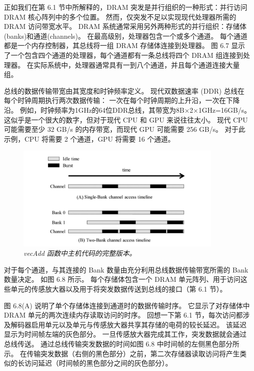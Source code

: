 正如我们在第 6.1 节中所解释的，DRAM 突发是并行组织的一种形式：并行访问 DRAM 核心阵列中的多个位置。 
然而，仅突发不足以实现现代处理器所需的 DRAM 访问带宽水平。 
DRAM 系统通常采用另外两种形式的并行组织：存储体(banks)和通道(channels)。 
在最高级别，处理器包含一个或多个通道。 每个通道都是一个内存控制器，其总线将一组 DRAM 存储体连接到处理器。 
图 6.7 显示了一个包含四个通道的处理器，每个通道都有一条总线将四个 DRAM 组连接到处理器。 
在实际系统中，处理器通常具有一到八个通道，并且每个通道连接大量组。

总线的数据传输带宽由其宽度和时钟频率定义。 现代双数据速率 (DDR) 总线在每个时钟周期执行两次数据传输：
一次在每个时钟周期的上升沿，一次在下降沿。 例如，时钟频率为1GHz的64位DDR总线，其带宽为8B×2×1GHz=16GB/s。 
这似乎是一个很大的数字，但对于现代 CPU 和 GPU 来说往往太小。 
现代 CPU 可能需要至少 32 GB/s 的内存带宽，而现代 GPU 可能需要 256 GB/s。 
对于此示例，CPU 将需要 2 个通道，GPU 将需要 16 个通道。

\begin{figure}[H]
	\centering
	\includegraphics[width=0.9\textwidth]{figs/F6.8.png}
	\caption{\textit{\color{red} vecAdd 函数中主机代码的完整版本。}}
\end{figure}

对于每个通道，与其连接的 Bank 数量由充分利用总线数据传输带宽所需的 Bank 数量决定。 如图 6.8 所示。 
每个存储体包含一个 DRAM 单元阵列、用于访问这些单元的传感放大器以及用于将突发数据传送到总线的接口（第 6.1 节）。

图 6.8(A) 说明了单个存储体连接到通道时的数据传输时序。 它显示了对存储体中 DRAM 单元的两次连续内存读取访问的时序。 
回想一下第 6.1 节，每次访问都涉及解码器启用单元以及单元与传感放大器共享其存储的电荷的较长延迟。 
该延迟显示为时间帧左端的灰色部分。 一旦传感放大器完成其工作，突发数据就会通过总线传送。 
通过总线传输突发数据的时间如图 6.8 中时间帧的左侧黑色部分所示。 
在传输突发数据（右侧的黑色部分）之前，第二次存储器读取访问将产生类似的长访问延迟（时间帧的黑色部分之间的灰色部分）。

